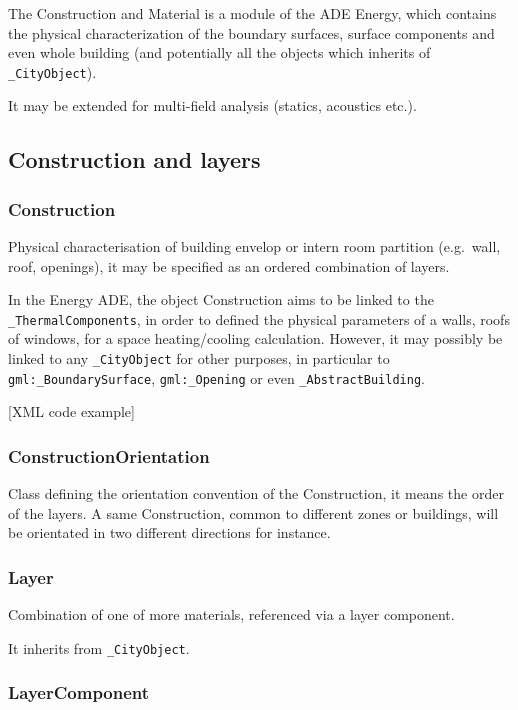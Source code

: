 \documentclass[a4paper,12pt]{article}
\begin{document}
The Construction and Material is a module of the ADE Energy, which
contains the physical characterization of the boundary surfaces, surface
components and even whole building (and potentially all the objects
which inherits of \texttt{\_CityObject}).

It may be extended for multi-field analysis (statics, acoustics etc.).

\subsection{Construction and layers}\label{construction-and-layers}

\subsubsection{Construction}\label{construction}

Physical characterisation of building envelop or intern room partition
(e.g.~wall, roof, openings), it may be specified as an ordered
combination of layers.

In the Energy ADE, the object Construction aims to be linked to the
\texttt{\_ThermalComponents}, in order to defined the physical
parameters of a walls, roofs of windows, for a space heating/cooling
calculation. However, it may possibly be linked to any
\texttt{\_CityObject} for other purposes, in particular to
\texttt{gml:\_BoundarySurface}, \texttt{gml:\_Opening} or even
\texttt{\_AbstractBuilding}.

{[}XML code example{]}

\subsubsection{ConstructionOrientation}\label{constructionorientation}

Class defining the orientation convention of the Construction, it means
the order of the layers. A same Construction, common to different zones
or buildings, will be orientated in two different directions for
instance.

\subsubsection{Layer}\label{layer}

Combination of one of more materials, referenced via a layer component.

It inherits from \texttt{\_CityObject}.

\subsubsection{LayerComponent}\label{layercomponent}
\end{document}
